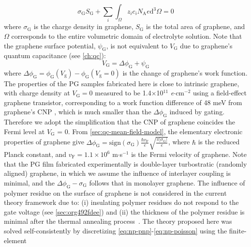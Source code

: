 \begin{equation}
  \label{eq:np-electro-neutral}
  \sigma_{\mathrm{G}} S_{\mathrm{G}} + \sum_{i} \int_{\Omega} z_{i} c_{i} N_{\mathrm{A}} e \mathrm{d}^{3} \Omega= 0
\end{equation}
where $\sigma_{\mathrm{G}}$ is the charge density in graphene,
$S_{\mathrm{G}}$ is the total area of graphene, and $\Omega$
corresponds to the entire volumetric domain of electrolyte
solution. Note that the graphene surface potential,
$\psi_{\mathrm{G}}$, is not equivalent to $V_{\mathrm{G}}$ due to graphene's quantum capacitance (see \autoref{ch:qc}):
\begin{equation}
  \label{eq:np-Vg}
  V_{\mathrm{G}} = \Delta \phi_{\mathrm{G}} + \psi_{\mathrm{G}}
\end{equation}
where
$\Delta \phi_{\mathrm{G}} = \phi_{\mathrm{G}}(V_{\mathrm{g}}) -
\phi_{\mathrm{G}}(V_{\mathrm{g}}=0)$ is the change of graphene’s work
function.
%
The properties of the PG samples fabricated here is close to
intrinsic graphene, with charge density at $V_{\mathrm{G}}=0$ measured
to be 1.4$\times$10$^{11}$ \textit{e}$\cdot$cm$^{-2}$ using a field-effect graphene transistor, corresponding
to a work function difference of 48 meV from graphene's CNP
, which is much smaller than the $\Delta \phi_{\mathrm{G}}$
induced by gating.
%
Therefore we adopt the simplification that the
CNP of graphene coincides the Fermi level at
$V_{\mathrm{G}}$ = 0.
%
From \autoref{sec:qc-mean-field-model}, the elementary electronic
properties of graphene give
\( {\displaystyle \Delta \phi_{\mathrm{G}} =
  \mathrm{sign}(\sigma_{\mathrm{G}}) \frac{\hbar v_{\mathrm{F}}}{e}
  \sqrt{\frac{\pi |\sigma_{\mathrm{G}}|}{e}}}\), where $\hbar$ is the
reduced Planck constant, and $v_{\mathrm{F}}=1.1\times10^{6}$
m$\cdot$s$^{-1}$ is the Fermi velocity of graphene.
%
Note that the PG film fabricated experimentally is double-layer
turbostratic (randomly aligned) graphene, in which we assume the
influence of interlayer coupling is minimal, and the
$\Delta \phi_{\mathrm{G}} - \sigma_{\mathrm{G}}$ follows that in
monolayer graphene.
%
The influence of polymer residue on the surface of graphene is not
considered in the current theory framework due to: (i) insulating
polymer residues do not respond to the gate voltage (see
\autoref{sec:org492fdee}) and (ii) the thickness of the polymer
residue is minimal after the thermal annealing
process~\autocite{Choi_2018_wafer_scale_gr}.
%
The theory proposed here was solved self-consistently by discretizing
\autoref{eq:np-pnp}-\autoref{eq:np-poisson} using the finite-element
